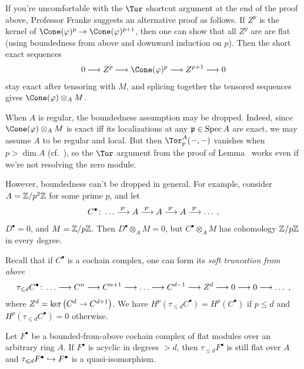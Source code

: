 \documentclass[a4paper,parskip=half,numbers=enddot, DIV=12]{scrreprt}
\renewcommand{\leq}{\leqslant}
\begin{document}
\begin{rem}
	\begin{alphanumerate}
		\item{} If you're uncomfortable with the $\Tor$ shortcut argument at the end of the proof above, Professor Franke suggests an alternative proof as follows. If $Z^p$ is the kernel of $\Cone(\phi)^p\morphism\Cone(\phi)^{p+1}$, then one can show that all $Z^p$ are are flat (using boundedness from above and downward induction on $p$). Then the short exact sequences
		\begin{align*}
			0\morphism Z^p\morphism \Cone(\phi)^p\morphism Z^{p+1}\morphism 0
		\end{align*}
		stay exact after tensoring with $M$, and splicing together the tensored sequences gives $\Cone(\phi)\otimes_AM$.
		\item When $A$ is regular, the boundedness assumption may be dropped. Indeed, since $\Cone(\phi)\otimes_AM$ is exact iff its localizations at any $\mathfrak{p}\in\operatorname{Spec} A$ are exact, we may assume $A$ to be regular and local. But then $\Tor_p^A(-,-)$ vanishes when $p>\dim A$ (cf.\ \cite[Theorem~1]{homalg}), so the $\Tor$ argument from the proof of Lemma~ works even if we're not resolving the zero module.
		
		However, boundedness can't be dropped in general. For example, consider $A=\mathbb{Z}/p^2\mathbb{Z}$ for some prime $p$, and let
		\begin{align*}
			C^\bullet\colon \ldots\morphism[ p\cdot]A\morphism[ p\cdot]A\morphism[ p\cdot]A\morphism[ p\cdot]\ldots\;,
		\end{align*}
		$D^\bullet=0$, and $M=\mathbb{Z}/p\mathbb{Z}$. Then $D^\bullet\otimes_AM=0$, but $C^\bullet\otimes_AM$ has cohomology $\mathbb{Z}/p\mathbb{Z}$ in every degree.
	\end{alphanumerate}
\end{rem}
Recall that if $C^\bullet$ is a cochain complex, one can form its \emph{soft truncation from above}
\begin{align*}
	\tau_{\leq d}C^\bullet\colon \ldots\morphism C^n\morphism C^{n+1}\morphism \ldots \morphism C^{d-1}\morphism Z^d\morphism 0\morphism 0\morphism \ldots\;,
\end{align*} 
where $Z^d=\ker\left(C^{d}\morphism C^{d+1}\right)$. We have $H^p(\tau_{\leq d}C^\bullet)=H^p(C^\bullet)$ if $p\leq d$ and $H^p(\tau_{\leq d}C^\bullet)=0$ otherwise.
\begin{lem}
	Let $F^\bullet$ be a bounded-from-above cochain complex of flat modules over an arbitrary ring $A$. If $F^\bullet$ is acyclic in degrees $>d$, then $\tau_{\leq d}F^\bullet$ is still flat over $A$ and $\tau_{\leq d}F^\bullet\monomorphism F^\bullet$ is a quasi-isomorphism.
\end{lem}
\end{document}
